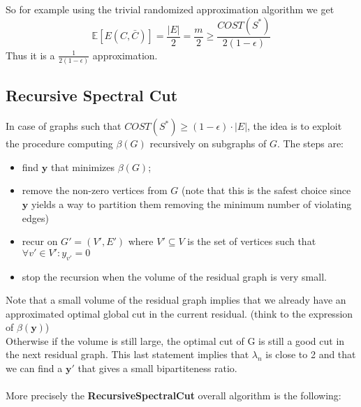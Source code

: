 So for example using the trivial randomized approximation algorithm we get
\[ \mathbb{E}[E(C,\bar{C})] = \frac{|E|}{2} = \frac{m}{2} \geq \frac{COST(S^*)}{2(1-\epsilon)} \]
Thus it is a $ \frac{1}{2(1-\epsilon)} $ approximation.

\subsection{Recursive Spectral Cut}
In case of graphs such that $ COST(S^*) \geq (1-\epsilon) \cdot |E| $, the idea is to exploit the procedure computing $ \beta(G) $ recursively on subgraphs of $ G $. The steps are:
\begin{itemize}
\item find $ \mathbf{y} $ that minimizes $ \beta(G) $;
\item remove the non-zero vertices from $ G $ (note that this is the safest choice since $ \mathbf{y} $ yields a way to partition them removing the minimum number of violating edges)
\item recur on $ G'=(V',E') $ where $ V' \subseteq V $ is the set of vertices such that $ \forall  v' \in V' : y_{v'} = 0 $
\item stop the recursion when the volume of the residual graph is very small.
\end{itemize}
Note that a small volume of the residual graph implies that we already have an approximated optimal global cut in the current residual. (think to the expression of $ \beta(\mathbf{y}) $)
\\
Otherwise if the volume is still large, the optimal cut of G is still a good cut in the next residual graph. This last statement implies that $ \lambda_n $ is close to 2 and that we can find a $ \mathbf{y'} $ that gives a small bipartiteness ratio.
\\ 
\\
More precisely the \textbf{RecursiveSpectralCut} overall algorithm is the following:
